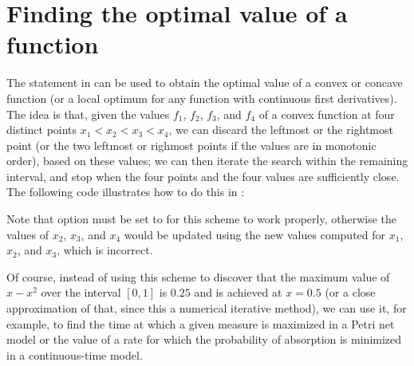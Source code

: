 \section{Finding the optimal value of a function}

The  statement in {\smart} can be used to obtain the optimal
value of a convex or concave function (or a local optimum for any function
with continuous first derivatives).
The idea is that, given the values $f_1$, $f_2$, $f_3$, and $f_4$
of a convex function at four distinct points $x_1 < x_2 < x_3 < x_4$,
we can discard the leftmost or the rightmost point (or the two leftmost
or righmost points if the values are in monotonic order), based on these values;
we can then iterate the search within the remaining interval,
and stop when the four points and the four values are sufficiently close.
The following code illustrates how to do this in {\smart}:
%

%
Note that option  must be set to  for this
scheme to work properly, otherwise the values of $x_2$, $x_3$, and $x_4$
would be updated using the new values computed for $x_1$, $x_2$, and $x_3$,
which is incorrect.

Of course, instead of using this scheme to discover that the maximum value
of $x-x^2$ over the interval $[0,1]$ is $0.25$ and is achieved at $x=0.5$
(or a close approximation of that, since this a numerical iterative method),
we can use it, for example, to find the time at which a given measure is
maximized in a Petri net model or the value of a rate for which the probability
of absorption is minimized in a continuous-time model.

